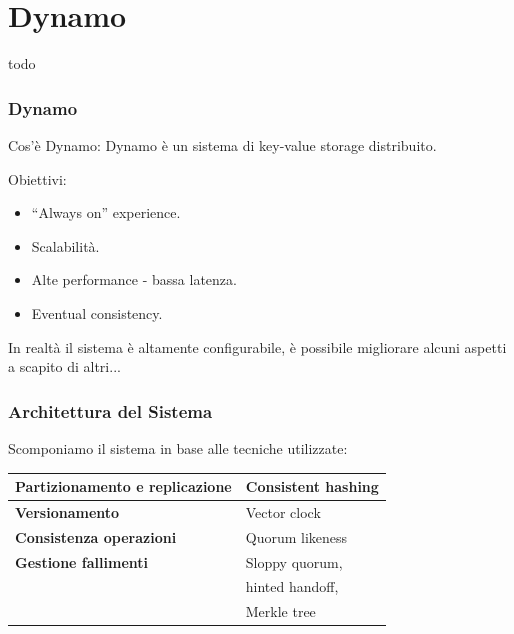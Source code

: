 \section{Dynamo}
\begin{frame}
  todo
\end{frame}


\begin{frame}
  \frametitle{Dynamo}
  \begin{block}{Cos'è Dynamo:}
  Dynamo è un sistema di key-value storage distribuito.
  \end{block}
  \begin{block}{Obiettivi:}      
      \begin{itemize}
      \item ``Always on'' experience.
      \item Scalabilità.
      \item Alte performance - bassa latenza.
      \item Eventual consistency.
      \end{itemize}
  \end{block}
  In realtà il sistema è altamente configurabile, è possibile migliorare alcuni aspetti a scapito di altri...
\end{frame}


\begin{frame}
  \frametitle{Architettura del Sistema}
  Scomponiamo il sistema in base alle tecniche utilizzate:
  \begin{center}
  \begin{tabular}{l | l}
    \textbf{Partizionamento e replicazione} & Consistent hashing \\
    \hline
    \textbf{Versionamento}                  & Vector clock \\
    \hline
    \textbf{Consistenza operazioni}         & Quorum likeness \\
    \hline
    \textbf{Gestione fallimenti}            & Sloppy quorum, \\
                                            & hinted handoff, \\
                                            & Merkle tree 
  \end{tabular}
  \end{center}
\end{frame}


